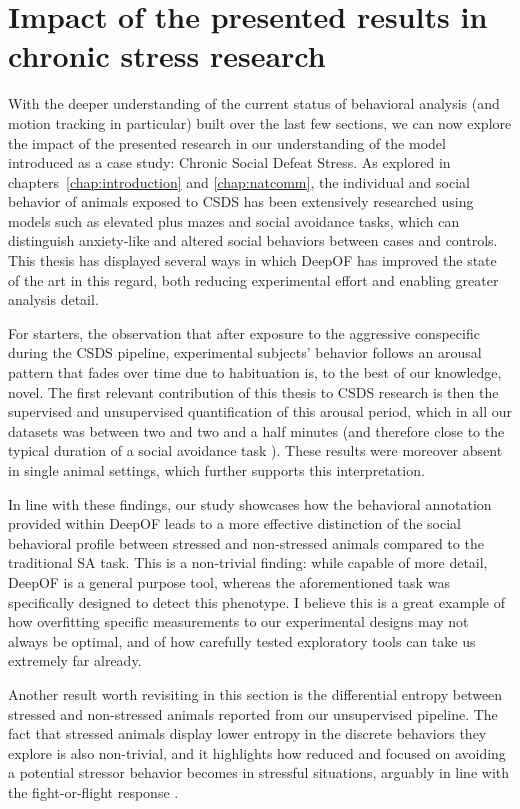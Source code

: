\section{Impact of the presented results in chronic stress research}

With the deeper understanding of the current status of behavioral analysis (and motion tracking in particular) built over the last few sections, we can now explore the impact of the presented research in our understanding of the model introduced as a case study: Chronic Social Defeat Stress.
As explored in chapters~\ref{chap:introduction} and \ref{chap:natcomm}, the individual and social behavior of animals exposed to CSDS has been extensively researched using models such as elevated plus mazes and social avoidance tasks, which can distinguish anxiety-like and altered social behaviors between cases and controls. This thesis has displayed several ways in which DeepOF has improved the state of the art in this regard, both reducing experimental effort and enabling greater analysis detail.

For starters, the observation that after exposure to the aggressive conspecific during the CSDS pipeline, experimental subjects' behavior follows an arousal pattern that fades over time due to habituation is, to the best of our knowledge, novel. The first relevant contribution of this thesis to CSDS research is then the supervised and unsupervised quantification of this arousal period, which in all our datasets was between two and two and a half minutes (and therefore close to the typical duration of a social avoidance task \cite{Kudryavtseva1991SocialStrain}). These results were moreover absent in single animal settings, which further supports this interpretation.

In line with these findings, our study showcases how the behavioral annotation provided within DeepOF leads to a more effective distinction of the social behavioral profile between stressed and non-stressed animals compared to the traditional SA task. This is a non-trivial finding: while capable of more detail, DeepOF is a general purpose tool, whereas the aforementioned task was specifically designed to detect this phenotype. I believe this is a great example of how overfitting specific measurements to our experimental designs may not always be optimal, and of how carefully tested exploratory tools can take us extremely far already.

Another result worth revisiting in this section is the differential entropy between stressed and non-stressed animals reported from our unsupervised pipeline. The fact that stressed animals display lower entropy in the discrete behaviors they explore is also non-trivial, and it highlights how reduced and focused on avoiding a potential stressor behavior becomes in stressful situations, arguably in line with the fight-or-flight response \cite{Chu2022PhysiologyReaction}.

